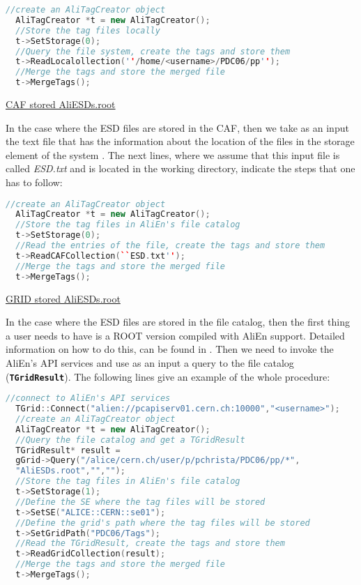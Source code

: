 \documentclass[12pt,a4paper,twoside]{article}
\newcommand{\class}[1]{\texttt{\textbf{#1}}\xspace}
\begin{document}
{\vspace{0.2 cm}

\begin{lstlisting}[language=C++]
  //create an AliTagCreator object
  AliTagCreator *t = new AliTagCreator(); 
  //Store the tag files locally
  t->SetStorage(0);
  //Query the file system, create the tags and store them
  t->ReadLocalollection(''/home/<username>/PDC06/pp'');
  //Merge the tags and store the merged file
  t->MergeTags();
\end{lstlisting}

\underline{CAF stored AliESDs.root}

In the case where the ESD files are stored in the CAF, then we take as
an input the text file that has the information about the location of
the files in the storage element of the system \cite{EventTagWeb,
  CAF}. The next lines, where we assume that this input file is called
\emph{ESD.txt} and is located in the working directory, indicate the
steps that one has to follow:


\begin{lstlisting}[language=C++]
  //create an AliTagCreator object
  AliTagCreator *t = new AliTagCreator(); 
  //Store the tag files in AliEn's file catalog
  t->SetStorage(0);
  //Read the entries of the file, create the tags and store them
  t->ReadCAFCollection(``ESD.txt'');
  //Merge the tags and store the merged file
  t->MergeTags();
\end{lstlisting}

\underline{GRID stored AliESDs.root}

In the case where the ESD files are stored in the file catalog, then
the first thing a user needs to have is a ROOT version compiled with
AliEn support. Detailed information on how to do this, can be found in
\cite{RootApi}. Then we need to invoke the AliEn's API services
\cite{RootApi} and use as an input a query to the file catalog
(\class{TGridResult}). The following lines give an example of the
whole procedure:

 
\begin{lstlisting}[language=C++]
  //connect to AliEn's API services
  TGrid::Connect("alien://pcapiserv01.cern.ch:10000","<username>");   
  //create an AliTagCreator object
  AliTagCreator *t = new AliTagCreator(); 
  //Query the file catalog and get a TGridResult
  TGridResult* result = 
  gGrid->Query("/alice/cern.ch/user/p/pchrista/PDC06/pp/*",
  "AliESDs.root","","");
  //Store the tag files in AliEn's file catalog
  t->SetStorage(1);
  //Define the SE where the tag files will be stored
  t->SetSE("ALICE::CERN::se01");
  //Define the grid's path where the tag files will be stored
  t->SetGridPath("PDC06/Tags");
  //Read the TGridResult, create the tags and store them
  t->ReadGridCollection(result);
  //Merge the tags and store the merged file
  t->MergeTags();
\end{lstlisting}



}
\end{document}
